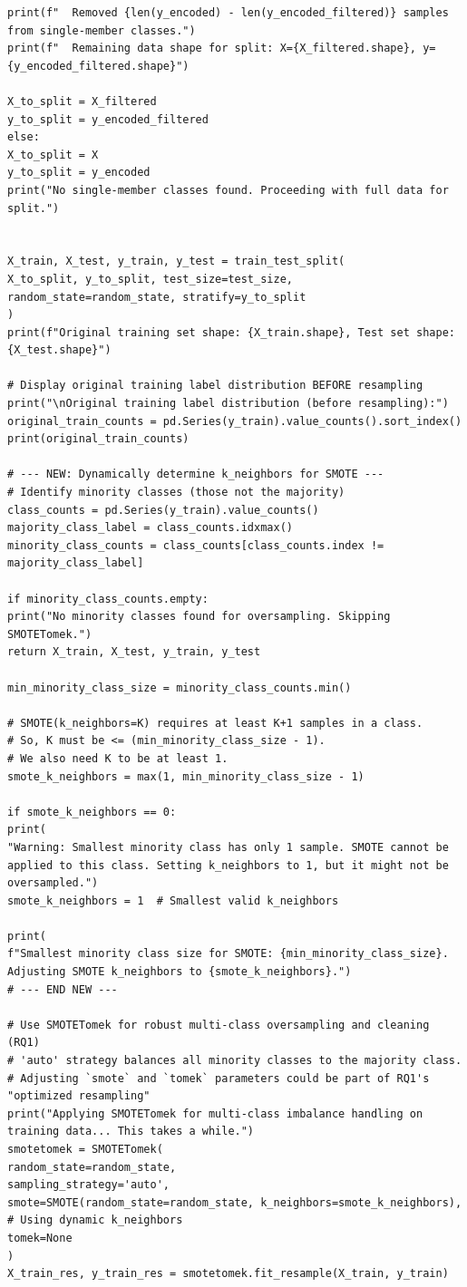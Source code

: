 \begin{lstlisting}[caption={Complete pipeline of XGBoost using CIC-IDS2017 in NIDS using Python}, label={lst:python-pipeline}]
print(f"  Removed {len(y_encoded) - len(y_encoded_filtered)} samples from single-member classes.")
print(f"  Remaining data shape for split: X={X_filtered.shape}, y={y_encoded_filtered.shape}")

X_to_split = X_filtered
y_to_split = y_encoded_filtered
else:
X_to_split = X
y_to_split = y_encoded
print("No single-member classes found. Proceeding with full data for split.")


X_train, X_test, y_train, y_test = train_test_split(
X_to_split, y_to_split, test_size=test_size, random_state=random_state, stratify=y_to_split
)
print(f"Original training set shape: {X_train.shape}, Test set shape: {X_test.shape}")

# Display original training label distribution BEFORE resampling
print("\nOriginal training label distribution (before resampling):")
original_train_counts = pd.Series(y_train).value_counts().sort_index()
print(original_train_counts)

# --- NEW: Dynamically determine k_neighbors for SMOTE ---
# Identify minority classes (those not the majority)
class_counts = pd.Series(y_train).value_counts()
majority_class_label = class_counts.idxmax()
minority_class_counts = class_counts[class_counts.index != majority_class_label]

if minority_class_counts.empty:
print("No minority classes found for oversampling. Skipping SMOTETomek.")
return X_train, X_test, y_train, y_test

min_minority_class_size = minority_class_counts.min()

# SMOTE(k_neighbors=K) requires at least K+1 samples in a class.
# So, K must be <= (min_minority_class_size - 1).
# We also need K to be at least 1.
smote_k_neighbors = max(1, min_minority_class_size - 1)

if smote_k_neighbors == 0:
print(
"Warning: Smallest minority class has only 1 sample. SMOTE cannot be applied to this class. Setting k_neighbors to 1, but it might not be oversampled.")
smote_k_neighbors = 1  # Smallest valid k_neighbors

print(
f"Smallest minority class size for SMOTE: {min_minority_class_size}. Adjusting SMOTE k_neighbors to {smote_k_neighbors}.")
# --- END NEW ---

# Use SMOTETomek for robust multi-class oversampling and cleaning (RQ1)
# 'auto' strategy balances all minority classes to the majority class.
# Adjusting `smote` and `tomek` parameters could be part of RQ1's "optimized resampling"
print("Applying SMOTETomek for multi-class imbalance handling on training data... This takes a while.")
smotetomek = SMOTETomek(
random_state=random_state,
sampling_strategy='auto',
smote=SMOTE(random_state=random_state, k_neighbors=smote_k_neighbors),  # Using dynamic k_neighbors
tomek=None
)
X_train_res, y_train_res = smotetomek.fit_resample(X_train, y_train)


\end{lstlisting}
